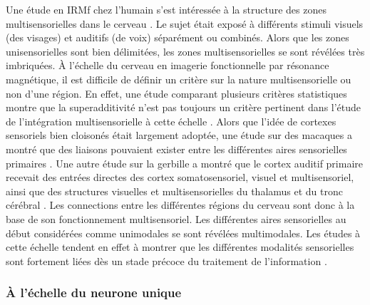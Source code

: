 Une étude en IRMf chez l'humain s'est intéressée à la structure des zones multisensorielles dans le cerveau \cite{beauchamp_unraveling_2004}. Le sujet était exposé à différents stimuli visuels (des visages) et auditifs (de voix) séparément ou combinés. Alors que les zones unisensorielles sont bien délimitées, les zones multisensorielles se sont révélées très imbriquées.
À l'échelle du cerveau en imagerie fonctionnelle par résonance magnétique, il est difficile de définir un critère sur la nature multisensorielle ou non d'une région. En effet, une étude comparant plusieurs critères statistiques montre que la superadditivité n'est pas toujours un critère pertinent dans l'étude de l'intégration multisensorielle à cette échelle \cite{beauchamp_statistical_2005}.
Alors que l'idée de cortexes sensoriels bien cloisonés était largement adoptée, une étude sur des macaques a montré que des liaisons pouvaient exister entre les différentes aires sensorielles primaires \cite{brosch_nonauditory_2005}. Une autre étude sur la gerbille a montré que le cortex auditif primaire recevait des entrées directes des cortex somatosensoriel, visuel et multisensoriel, ainsi que des structures visuelles et multisensorielles du thalamus et du tronc cérébral \cite{budinger_multisensory_2006}.
Les connections entre les différentes régions du cerveau sont donc à la base de son fonctionnement multisensoriel. Les différentes aires sensorielles au début considérées comme unimodales se sont révélées multimodales. Les études à cette échelle tendent en effet à montrer que les différentes modalités sensorielles sont fortement liées dès un stade précoce du traitement de l'information \cite{stein_multisensory_2008}.


\subsubsection{À l'échelle du neurone unique}

